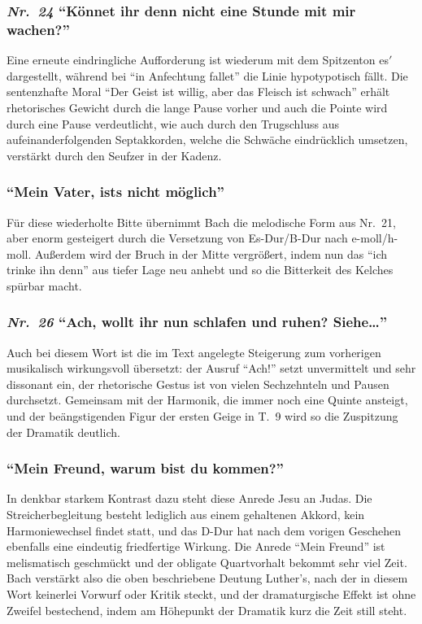 \documentclass[a4paper,11pt,twoside]{scrartcl}
\newcommand{\Nr}[1]{\textmd{\textit{Nr.~#1}}}
\begin{document}
\subsubsection*{\Nr{24} \enquote{Könnet ihr denn nicht eine Stunde mit mir wachen?}}
Eine erneute eindringliche Aufforderung ist wiederum mit dem Spitzenton
es$'$ dargestellt, während bei \enquote{in Anfechtung fallet} die Linie
hypotypotisch fällt.  Die sentenzhafte Moral \enquote{Der Geist
ist willig, aber das Fleisch ist schwach} erhält rhetorisches Gewicht
durch die lange Pause vorher und auch die Pointe wird durch eine Pause
verdeutlicht, wie auch durch den Trugschluss aus aufeinanderfolgenden
Septakkorden, welche die Schwäche eindrücklich umsetzen, verstärkt durch
den Seufzer in der Kadenz.

\subsubsection*{\enquote{Mein Vater, ists nicht möglich}}
Für diese wiederholte Bitte übernimmt Bach die melodische Form aus
Nr.~21, aber enorm gesteigert durch die Versetzung von Es-Dur/B-Dur
nach e-moll/h-moll.  Außerdem wird der Bruch in der Mitte vergrößert,
indem nun das \enquote{ich trinke ihn denn} aus tiefer Lage neu anhebt
und so die Bitterkeit des Kelches spürbar macht.

\subsubsection*{\Nr{26} \enquote{Ach, wollt ihr nun schlafen und ruhen? Siehe…}}
Auch bei diesem Wort ist die im Text angelegte Steigerung zum vorherigen
musikalisch wirkungsvoll übersetzt: der Ausruf \enquote{Ach!} setzt
unvermittelt und sehr dissonant ein, der rhetorische Gestus ist von
vielen Sechzehnteln und Pausen durchsetzt.  Gemeinsam mit der Harmonik,
die immer noch eine Quinte ansteigt, und der beängstigenden Figur der
ersten Geige in T.~9 wird so die Zuspitzung der Dramatik deutlich.

\subsubsection*{\enquote{Mein Freund, warum bist du kommen?}}
In denkbar starkem Kontrast dazu steht diese Anrede Jesu an Judas. Die
Streicherbegleitung besteht lediglich aus einem gehaltenen Akkord,
kein Harmoniewechsel findet statt, und das D-Dur hat nach dem vorigen
Geschehen ebenfalls eine eindeutig friedfertige Wirkung.  Die Anrede
\enquote{Mein Freund} ist melismatisch geschmückt und der obligate
Quartvorhalt bekommt sehr viel Zeit.  Bach verstärkt also die oben
beschriebene Deutung Luther’s, nach der in diesem Wort keinerlei
Vorwurf oder Kritik steckt, und der dramaturgische Effekt ist ohne
Zweifel bestechend, indem am Höhepunkt der Dramatik kurz die Zeit
still steht.
\end{document}
